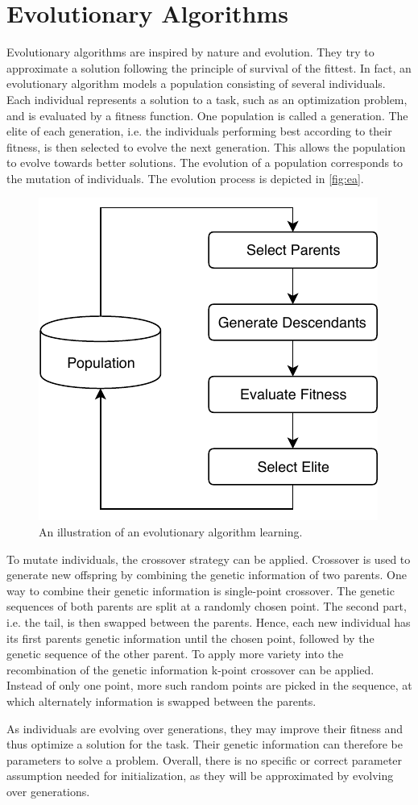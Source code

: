 \section{Evolutionary Algorithms}
\label{sec:ea}
Evolutionary algorithms are inspired by nature and evolution.
They try to approximate a solution following the principle of survival of the fittest.
In fact, an evolutionary algorithm models a population consisting of several individuals.
Each individual represents a solution to a task, such as an optimization problem, and is evaluated by a fitness function.
One population is called a generation.
The elite of each generation, i.e. the individuals performing best according to their fitness, is then selected to evolve the next generation.
This allows the population to evolve towards better solutions.
The evolution of a population corresponds to the mutation of individuals.
The evolution process is depicted in \autoref{fig:ea}.

\begin{figure}[h]
\centering
\includegraphics[width=.7\columnwidth]{figures/ea_fig.pdf}
\caption{An illustration of an evolutionary algorithm learning. \cite{Dillmann2017}}
\label{fig:ea}
\end{figure}

To mutate individuals, the crossover strategy can be applied.
Crossover is used to generate new offspring by combining the genetic information of two parents.
One way to combine their genetic information is single-point crossover.
The genetic sequences of both parents are split at a randomly chosen point.
The second part, i.e. the tail, is then swapped between the parents.
Hence, each new individual has its first parents genetic information until the chosen point, followed by the genetic sequence of the other parent.
To apply more variety into the recombination of the genetic information k-point crossover can be applied.
Instead of only one point, more such random points are picked in the sequence, at which alternately information is swapped between the parents.
\cite{Dillmann2017}

As individuals are evolving over generations, they may improve their fitness and thus optimize a solution for the task.
Their genetic information can therefore be parameters to solve a problem.
Overall, there is no specific or correct parameter assumption needed for initialization, as they will be approximated by evolving over generations.
